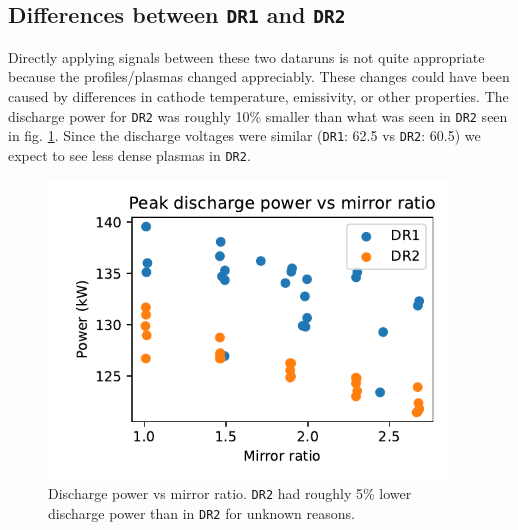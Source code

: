 \subsection{Differences between \texttt{DR1} and \texttt{DR2}}
Directly applying signals between these two dataruns is not quite appropriate because the profiles/plasmas changed appreciably. These changes could have been caused by differences in cathode temperature, emissivity, or other properties. The discharge power for \texttt{DR2} was roughly 10\% smaller than what was seen in \texttt{DR2} seen in fig. \ref{fig_extra:discharger-power_vs_M}. Since the discharge voltages were similar (\texttt{DR1}: 62.5 vs \texttt{DR2}: 60.5) we expect to see less dense plasmas in \texttt{DR2}. 
\begin{figure}
    \centering
    \includegraphics[width=300pt]{figures/extra/discharge-power_vs_M.pdf}
    \caption[Discharge power vs mirror ratio]{Discharge power vs mirror ratio. \texttt{DR2} had roughly 5\% lower discharge power than in \texttt{DR2} for unknown reasons.}
    \label{fig_extra:discharger-power_vs_M}
\end{figure}

